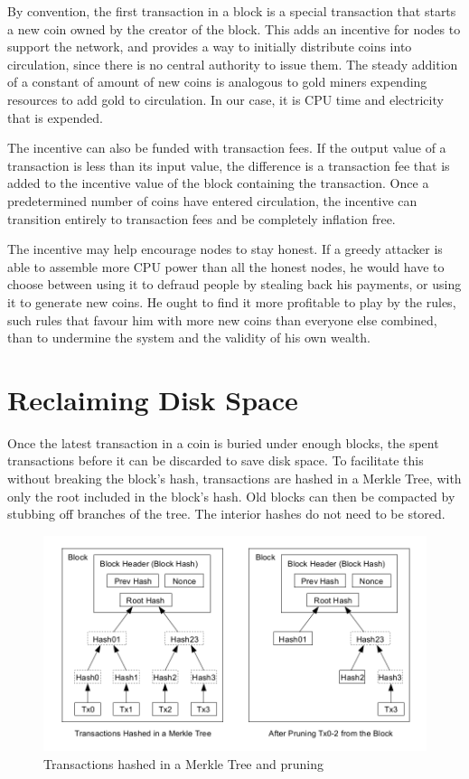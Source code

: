 By convention, the first transaction in a block is a special transaction that starts a new coin owned by the creator of the block. This adds an incentive for nodes to support the network, and provides a way to initially distribute coins into circulation, since there is no central authority to issue them. The steady addition of a constant of amount of new coins is analogous to gold miners expending resources to add gold to circulation. In our case, it is CPU time and electricity that is expended.

The incentive can also be funded with transaction fees. If the output value of a transaction is less than its input value, the difference is a transaction fee that is added to the incentive value of the block containing the transaction. Once a predetermined number of coins have entered circulation, the incentive can transition entirely to transaction fees and be completely inflation free.

The incentive may help encourage nodes to stay honest. If a greedy attacker is able to assemble more CPU power than all the honest nodes, he would have to choose between using it to defraud people by stealing back his payments, or using it to generate new coins. He ought to find it more profitable to play by the rules, such rules that favour him with more new coins than everyone else combined, than to undermine the system and the validity of his own wealth.

\section{Reclaiming Disk Space}

Once the latest transaction in a coin is buried under enough blocks, the spent transactions before it can be discarded to save disk space. To facilitate this without breaking the block's hash, transactions are hashed in a Merkle Tree, with only the root included in the block's hash. Old blocks can then be compacted by stubbing off branches of the tree. The interior hashes do not need to be stored.

\begin{figure}[ht!]
\centering
\includegraphics[trim = 0mm 0mm 0mm 0mm, width=120mm]{images/merkle_tree_and_pruning}
\caption{Transactions hashed in a Merkle Tree and pruning}
\end{figure}

